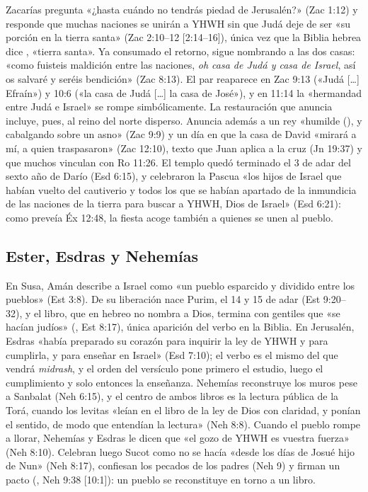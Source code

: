 Zacarías pregunta «¿hasta cuándo no tendrás piedad de Jerusalén?» (Zac 1:12) y responde que muchas naciones se unirán a YHWH sin que Judá deje de ser «su porción en la tierra santa» (Zac 2:10--12 [2:14--16]), única vez que la Biblia hebrea dice , «tierra santa». Ya consumado el retorno, sigue nombrando a las dos casas: «como fuisteis maldición entre las naciones, \emph{oh casa de Judá y casa de Israel}, así os salvaré y seréis bendición» (Zac 8:13). El par reaparece en Zac 9:13 («Judá [\ldots] Efraín») y 10:6 («la casa de Judá [\ldots] la casa de José»), y en 11:14 la «hermandad entre Judá e Israel» se rompe simbólicamente. La restauración que anuncia incluye, pues, al reino del norte disperso. Anuncia además a un rey «humilde (), y cabalgando sobre un asno» (Zac 9:9) y un día en que la casa de David «mirará a mí, a quien traspasaron» (Zac 12:10), texto que Juan aplica a la cruz (Jn 19:37) y que muchos vinculan con Ro 11:26. El templo quedó terminado el 3 de adar del sexto año de Darío (Esd 6:15), y celebraron la Pascua «los hijos de Israel que habían vuelto del cautiverio y todos los que se habían apartado de la inmundicia de las naciones de la tierra para buscar a YHWH, Dios de Israel» (Esd 6:21): como preveía Éx 12:48, la fiesta acoge también a quienes se unen al pueblo.

\subsection{Ester, Esdras y Nehemías}
En Susa, Amán describe a Israel como «un pueblo esparcido y dividido entre los pueblos» (Est 3:8). De su liberación nace Purim, el 14 y 15 de adar (Est 9:20--32), y el libro, que en hebreo no nombra a Dios, termina con gentiles que «se hacían judíos» (, Est 8:17), única aparición del verbo en la Biblia. En Jerusalén, Esdras «había preparado su corazón para inquirir la ley de YHWH y para cumplirla, y para enseñar en Israel» (Esd 7:10); el verbo  es el mismo del que vendrá \emph{midrash}, y el orden del versículo pone primero el estudio, luego el cumplimiento y solo entonces la enseñanza. Nehemías reconstruye los muros pese a Sanbalat (Neh 6:15), y el centro de ambos libros es la lectura pública de la Torá, cuando los levitas «leían en el libro de la ley de Dios con claridad, y ponían el sentido, de modo que entendían la lectura» (Neh 8:8). Cuando el pueblo rompe a llorar, Nehemías y Esdras le dicen que «el gozo de YHWH es vuestra fuerza» (Neh 8:10). Celebran luego Sucot como no se hacía «desde los días de Josué hijo de Nun» (Neh 8:17), confiesan los pecados de los padres (Neh 9) y firman un pacto (, Neh 9:38 [10:1]): un pueblo se reconstituye en torno a un libro.

